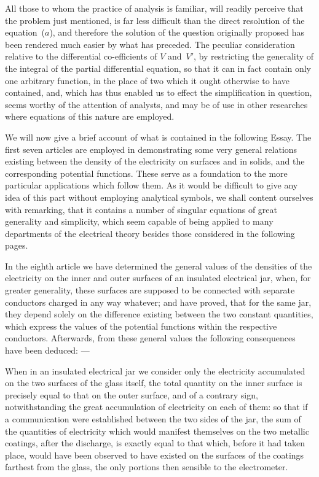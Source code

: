 \documentclass[12pt,notitlepage]{amsart}
\begin{document}
All those to whom the practice of analysis is familiar, will readily perceive
that the problem just mentioned,
is far less difficult than the direct resolution
of the equation~($a$),
and therefore the solution of the question originally proposed
has been rendered much easier by what has preceded. The peculiar
consideration relative to the differential co-efficients
of $V$ and~$V'$, by restricting
the generality of the integral of the partial differential equation,
so that it can
in fact contain only one arbitrary function,
in the place of two which it ought
otherwise to have contained, and, which has thus enabled us to effect the
simplification in question, seems worthy of the attention of analysts, and may
be of use in other researches where equations of this nature are employed.

We will now give a brief account of what is contained in the following
Essay. The first seven articles are employed in demonstrating some
very general relations existing between the density of the electricity on 
surfaces and in solids, and the corresponding potential functions. These serve
as a foundation to the more particular applications which follow them. As it
would be difficult to give any idea of this part without employing analytical
symbols, we shall content ourselves with remarking, that it contains a number
of singular equations of great generality and simplicity, which seem capable of
being applied to many departments of the electrical theory besides those 
considered in the following pages.

In the eighth article we have determined the general values of the
densities of the electricity on the inner and outer surfaces of an insulated
electrical jar, when, for greater generality, these surfaces are supposed to be
connected with separate conductors charged in any way whatever; and have
proved, that for the same jar, they depend solely on the difference existing
between the two constant quantities, which express the values of the potential
functions within the respective conductors. Afterwards, from these general
values the following consequences have been deduced: ---

When in an insulated electrical jar we consider only the electricity
accumulated on the two surfaces of the glass itself, the total quantity on the
inner surface is precisely equal to that on the outer surface, and of a contrary
sign, notwithstanding the great accumulation of electricity on each of them:
so that if a communication were established between the two sides of the jar,
the sum of the quantities of electricity which would manifest themselves on
the two metallic coatings, after the discharge, is exactly equal to that which,
before it had taken place, would have been observed to have existed on the
surfaces of the coatings farthest from the glass,
the only portions then sensible
to the electrometer.
\end{document}
